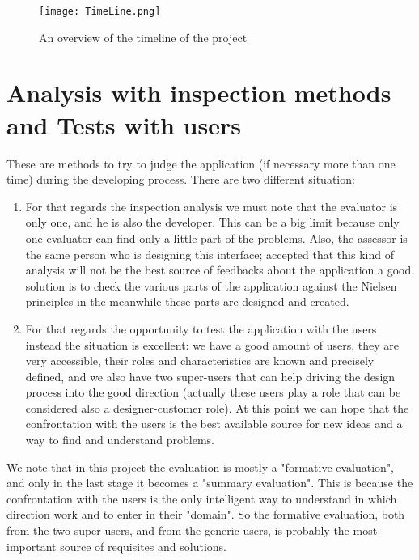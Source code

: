 \begin{figure}[H]
\centering
\texttt{[image: TimeLine.png]} 
\caption{An overview of the timeline of the project}
\end{figure}


\section{Analysis with inspection methods and Tests with users}
These are methods to try to judge the application (if necessary more than one time) during the developing process. There are two different situation:

\begin{enumerate}

\item For that regards the inspection analysis we must note that the evaluator is only one, and he is also the developer. This can be a big limit because only one evaluator can find only a little part of the problems. Also, the assessor is the same person who is designing this interface; accepted that this kind of analysis will not be the best source of feedbacks about the application a good solution is to check the various parts of the application against the Nielsen principles in the meanwhile these parts are designed and created.

\item For that regards the opportunity to test the application with the users instead the situation is excellent: we have a good amount of users, they are very accessible, their roles and characteristics are known and precisely defined, and we also have two super-users that can help driving the design process into the good direction (actually these users play a role that can be considered also a designer-customer role). At this point we can hope that the confrontation with the users is the best available source for new ideas and a way to find and understand problems.    

\end{enumerate}

We note that in this project the evaluation is mostly a "formative evaluation", and only in the last stage it becomes a "summary evaluation". This is because the confrontation with the users is the only intelligent way to understand in which direction work and to enter in their "domain". So the formative evaluation, both from the two super-users, and from the generic users, is probably the most important source of requisites and solutions.   


